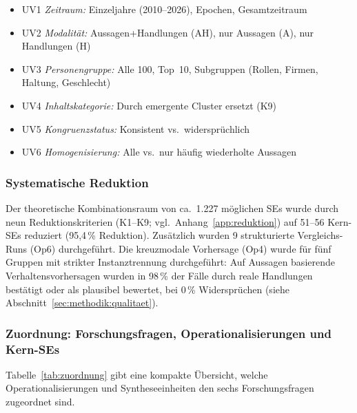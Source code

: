 \documentclass[12pt,a4paper]{article}
\begin{document}
\begin{itemize}[nosep]
  \item UV1 \emph{Zeitraum:} Einzeljahre (2010--2026), Epochen, Gesamtzeitraum
  \item UV2 \emph{Modalit\"at:} Aussagen+Handlungen (AH), nur Aussagen (A), nur Handlungen (H)
  \item UV3 \emph{Personengruppe:} Alle 100, Top~10, Subgruppen (Rollen, Firmen, Haltung, Geschlecht)
  \item UV4 \emph{Inhaltskategorie:} Durch emergente Cluster ersetzt (K9)
  \item UV5 \emph{Kongruenzstatus:} Konsistent vs.\ widerspr\"uchlich
  \item UV6 \emph{Homogenisierung:} Alle vs.\ nur h\"aufig wiederholte Aussagen
\end{itemize}

\subsubsection{Systematische Reduktion}

Der theoretische Kombinationsraum von ca.\ 1.227 m\"oglichen SEs wurde durch neun Reduktionskriterien (K1--K9; vgl.\ Anhang~\ref{app:reduktion}) auf 51--56 Kern-SEs reduziert (95,4\,\% Reduktion). Zus\"atzlich wurden 9 strukturierte Vergleichs-Runs (Op6) durchgef\"uhrt. Die kreuzmodale Vorhersage (Op4) wurde f\"ur f\"unf Gruppen mit strikter Instanztrennung durchgef\"uhrt: Auf Aussagen basierende Verhaltensvorhersagen wurden in 98\,\% der F\"alle durch reale Handlungen best\"atigt oder als plausibel bewertet, bei 0\,\% Widerspr\"uchen (siehe Abschnitt~\ref{sec:methodik:qualitaet}).

\subsubsection{Zuordnung: Forschungsfragen, Operationalisierungen und Kern-SEs}

Tabelle~\ref{tab:zuordnung} gibt eine kompakte \"Ubersicht, welche Operationalisierungen und Syntheseeinheiten den sechs Forschungsfragen zugeordnet sind.
\end{document}
